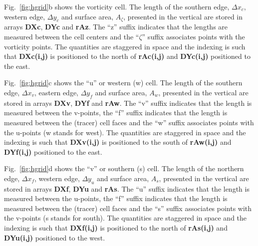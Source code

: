 Fig.~\ref{fig:hgrid}b shows the vorticity cell. The length of the
southern edge, $\Delta x_c$, western edge, $\Delta y_c$ and surface
area, $A_\zeta$, presented in the vertical are stored in arrays {\bf
DXc}, {\bf DYc} and {\bf rAz}.
The ``z'' suffix indicates that the lengths are measured between the
cell centers and the ``$\zeta$'' suffix associates points with the
vorticity points. The quantities are staggered in space and the
indexing is such that {\bf DXc(i,j)} is positioned to the north of
{\bf rAc(i,j)} and {\bf DYc(i,j)} positioned to the east.

Fig.~\ref{fig:hgrid}c shows the ``u'' or western (w) cell. The length of
the southern edge, $\Delta x_v$, eastern edge, $\Delta y_f$ and
surface area, $A_w$, presented in the vertical are stored in arrays
{\bf DXv}, {\bf DYf} and {\bf rAw}. 
The ``v'' suffix indicates that the length is measured between the
v-points, the ``f'' suffix indicates that the length is measured
between the (tracer) cell faces and the ``w'' suffix associates points
with the u-points (w stands for west). The quantities are staggered in
space and the indexing is such that {\bf DXv(i,j)} is positioned to
the south of {\bf rAw(i,j)} and {\bf DYf(i,j)} positioned to the east.

Fig.~\ref{fig:hgrid}d shows the ``v'' or southern (s) cell. The length of
the northern edge, $\Delta x_f$, western edge, $\Delta y_u$ and
surface area, $A_s$, presented in the vertical are stored in arrays
{\bf DXf}, {\bf DYu} and {\bf rAs}. 
The ``u'' suffix indicates that the length is measured between the
u-points, the ``f'' suffix indicates that the length is measured
between the (tracer) cell faces and the ``s'' suffix associates points
with the v-points (s stands for south). The quantities are staggered
in space and the indexing is such that {\bf DXf(i,j)} is positioned to
the north of {\bf rAs(i,j)} and {\bf DYu(i,j)} positioned to the west.


